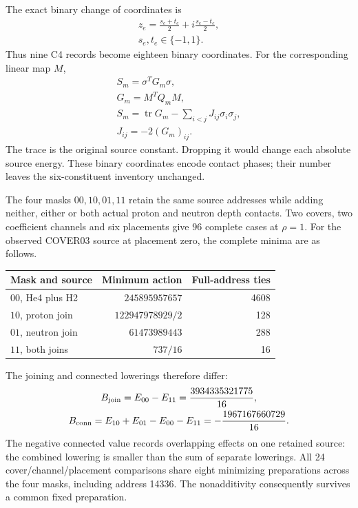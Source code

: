The exact binary change of coordinates is
\[
\begin{gathered}
z_e=\frac{s_e+t_e}{2}+i\frac{s_e-t_e}{2},\\
 s_e,t_e\in\{-1,1\}.
\end{gathered}
\]
Thus nine C4 records become eighteen binary coordinates. For the corresponding
linear map \(M\),
\[
\begin{gathered}
S_m=\sigma^TG_m\sigma,\\
 G_m=M^TQ_mM,\\
 S_m=\operatorname{tr}G_m-\sum_{i<j}J_{ij}\sigma_i\sigma_j,\\
 J_{ij}=-2(G_m)_{ij}.
\end{gathered}
\]
The trace is the original source constant. Dropping it would change each
absolute source energy. These binary coordinates encode contact phases;
their number leaves the six-constituent inventory unchanged.

The four masks \(00,10,01,11\) retain the same source addresses while adding
neither, either or both actual proton and neutron depth contacts. Two covers,
two coefficient channels and six placements give 96 complete cases at
\(\rho=1\). For the observed COVER03 source at placement zero, the complete
minima are as follows.

\begin{center}
\begin{tabular}{lrr}
\toprule
Mask and source & Minimum action & Full-address ties\\
\midrule
\(00\), He4 plus H2 & \(245895957657\) & 4608\\
\(10\), proton join & \(122947978929/2\) & 128\\
\(01\), neutron join & \(61473989443\) & 288\\
\(11\), both joins & \(737/16\) & 16\\
\bottomrule
\end{tabular}
\end{center}

The joining and connected lowerings therefore differ:
\[
\begin{gathered}
B_{\rm join}=E_{00}-E_{11}=\frac{3934335321775}{16},
 \\
 B_{\rm conn}=E_{10}+E_{01}-E_{00}-E_{11}
             =-\frac{1967167660729}{16}.
\end{gathered}
\]
The negative connected value records overlapping effects on one retained
source: the combined lowering is smaller than the sum of separate lowerings.
All 24 cover/channel/placement comparisons share eight minimizing
preparations across the four masks, including address 14336. The
nonadditivity consequently survives a common fixed preparation.

